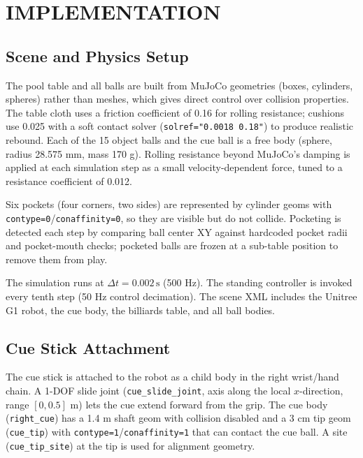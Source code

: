 \documentclass[letterpaper, 12 pt, conference]{ieeeconf}
\begin{document}
\section{IMPLEMENTATION}

\subsection{Scene and Physics Setup}

The pool table and all balls are built from MuJoCo geometries (boxes,
cylinders, spheres) rather than meshes, which gives direct control over collision
properties. The table cloth uses a friction coefficient of 0.16 for rolling
resistance; cushions use 0.025 with a soft contact solver (\texttt{solref="0.0018
0.18"}) to produce realistic rebound. Each of the 15 object balls and the cue
ball is a free body (sphere, radius 28.575 mm, mass 170 g). Rolling resistance
beyond MuJoCo's damping is applied at each simulation step as a small
velocity-dependent force, tuned to a resistance coefficient of 0.012.

Six pockets (four corners, two sides) are represented by cylinder geoms
with \texttt{contype=0}/\texttt{conaffinity=0}, so they are visible but do not
collide. Pocketing is detected each step by comparing ball center XY against
hardcoded pocket radii and pocket-mouth checks; pocketed balls are frozen at a
sub-table position to remove them from play.

The simulation runs at $\Delta t = 0.002\,\text{s}$ (500 Hz). The standing
controller is invoked every tenth step (50 Hz control decimation). The scene XML
includes the Unitree G1 robot, the cue body, the billiards table, and all ball bodies.

\subsection{Cue Stick Attachment}

The cue stick is attached to the robot as a child body in the right wrist/hand
chain. A 1-DOF slide joint
(\texttt{cue\_slide\_joint}, axis along the local $x$-direction, range
$[0, 0.5]$ m) lets the cue extend forward from the grip. The cue body
(\texttt{right\_cue}) has a 1.4 m shaft geom with collision disabled and a
3 cm tip geom (\texttt{cue\_tip}) with \texttt{contype=1}/\texttt{conaffinity=1}
that can contact the cue ball. A site (\texttt{cue\_tip\_site}) at the tip is
used for alignment geometry.
\end{document}
